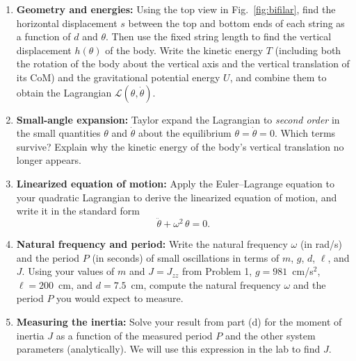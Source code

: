 \documentclass[11pt,letterpaper]{article}
\begin{document}
\begin{enumerate}[label=(\alph*)]
    \item \textbf{Geometry and energies:} Using the top view in Fig.~\ref{fig:bifilar}, find the horizontal displacement $s$ between the top and bottom ends of each string as a function of $d$ and $\theta$. Then use the fixed string length to find the vertical displacement $h(\theta)$ of the body. Write the kinetic energy $T$ (including both the rotation of the body about the vertical axis and the vertical translation of its CoM) and the gravitational potential energy $U$, and combine them to obtain the Lagrangian $\mathcal{L}(\theta,\dot\theta)$.

    \item \textbf{Small-angle expansion:} Taylor expand the Lagrangian to \emph{second order} in the small quantities $\theta$ and $\dot\theta$ about the equilibrium $\theta=\dot\theta=0$. Which terms survive? Explain why the kinetic energy of the body's vertical translation no longer appears.

    \item \textbf{Linearized equation of motion:} Apply the Euler--Lagrange equation to your quadratic Lagrangian to derive the linearized equation of motion, and write it in the standard form
    \[
    \ddot\theta + \omega^2\,\theta = 0 .
    \]

    \item \textbf{Natural frequency and period:} Write the natural frequency $\omega$ (in rad/s) and the period $P$ (in seconds) of small oscillations in terms of $m$, $g$, $d$, $\ell$, and $J$. Using your values of $m$ and $J = J_{zz}$ from Problem 1, $g = 981$~cm/s$^2$, $\ell = 200$~cm, and $d = 7.5$~cm, compute the natural frequency $\omega$ and the period $P$ you would expect to measure.

    \item \textbf{Measuring the inertia:} Solve your result from part (d) for the moment of inertia $J$ as a function of the measured period $P$ and the other system parameters (analytically). We will use this expression in the lab to find $J$.

\end{enumerate}
\end{document}
